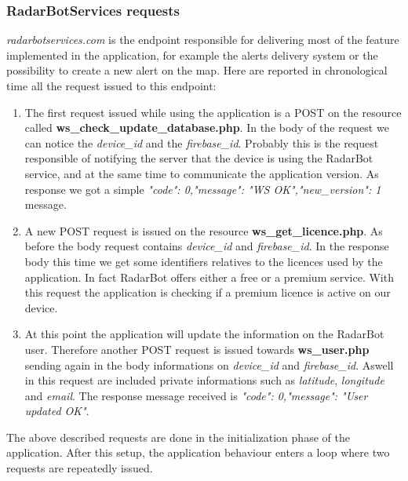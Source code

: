 		\subsubsection{RadarBotServices requests}
			\par \textit{radarbotservices.com} is the endpoint responsible for delivering most of the feature implemented in the application, for example the alerts delivery system or the possibility to create a new alert on the map. \newline
			Here are reported in chronological time all the request issued to this endpoint:
			\begin{enumerate}
				\item The first request issued while using the application is a POST on the resource called \textbf{ws\_check\_update\_database.php}. In the body of the request we can notice the \textit{device\_id} and the \textit{firebase\_id}. Probably this is the request responsible of notifying the server that the device is using the RadarBot service, and at the same time to communicate the application version. \newline
			As response we got a simple \textit{"code": 0,"message": "WS OK","new\_version": 1} message.\newline
				\item A new POST request is issued on the resource \textbf{ws\_get\_licence.php}. As before the body request contains \textit{device\_id} and \textit{firebase\_id}. \newline
				In the response body this time we get some identifiers relatives to the licences used by the application.\newline
				In fact RadarBot offers either a free or a premium service. With this request the application is checking if a premium licence is active on our device.\newline
				\item At this point the application will update the information on the RadarBot user. Therefore another POST request is issued towards \textbf{ws\_user.php} sending again in the body informations on  \textit{device\_id} and \textit{firebase\_id}. Aswell in this request are included private informations such as \textit{latitude}, \textit{longitude} and \textit{email}. \newline
				The response message received is \textit{"code": 0,"message": "User updated OK"}.\newline
			\end{enumerate}
			\par The above described requests are done in the initialization phase of the application. After this setup, the application behaviour enters a loop where two requests are repeatedly issued. \newline
